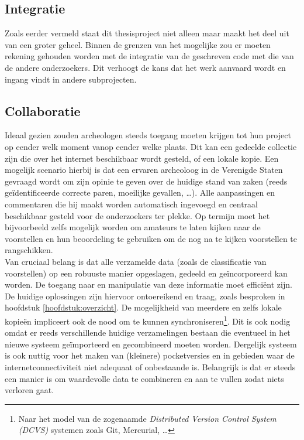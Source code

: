 \subsection{Integratie}
Zoals eerder vermeld staat dit thesisproject niet alleen maar maakt het deel uit van een groter geheel. Binnen de grenzen van het mogelijke zou er moeten rekening gehouden worden met de integratie van de geschreven code met die van de andere onderzoekers. Dit verhoogt de kans dat het werk aanvaard wordt en ingang vindt in andere subprojecten. 

\subsection{Collaboratie}
Ideaal gezien zouden archeologen steeds toegang moeten krijgen tot hun project op eender welk moment vanop eender welke plaats. Dit kan een gedeelde collectie zijn die over het internet beschikbaar wordt gesteld, of een lokale kopie. Een mogelijk scenario hierbij is dat een ervaren archeoloog in de Verenigde Staten gevraagd wordt om zijn opinie te geven over de huidige stand van zaken (reeds ge\"identificeerde correcte paren, moeilijke gevallen, \ldots). Alle aanpassingen en commentaren die hij maakt worden automatisch ingevoegd en centraal beschikbaar gesteld voor de onderzoekers ter plekke. Op termijn moet het bijvoorbeeld zelfs mogelijk worden om amateurs te laten kijken naar de voorstellen en hun beoordeling te gebruiken om de nog na te kijken voorstellen te rangschikken.\\

Van cruciaal belang is dat alle verzamelde data (zoals de classificatie van voorstellen) op een robuuste manier opgeslagen, gedeeld en ge\"incorporeerd kan worden. De toegang naar en manipulatie van deze informatie moet effici\"ent zijn. De huidige oplossingen zijn hiervoor ontoereikend en traag, zoals besproken in hoofdstuk \ref{hoofdstuk:overzicht}. De mogelijkheid van meerdere en zelfs lokale kopie\"en impliceert ook de nood om te kunnen synchroniseren\footnote{Naar het model van de zogenaamde \emph{Distributed Version Control System (DCVS)} systemen zoals Git, Mercurial, \ldots}. Dit is ook nodig omdat er reeds verschillende huidige verzamelingen bestaan die eventueel in het nieuwe systeem ge\"importeerd en gecombineerd moeten worden. Dergelijk systeem is ook nuttig voor het maken van (kleinere) pocketversies en in gebieden waar de internetconnectiviteit niet adequaat of onbestaande is. Belangrijk is dat er steeds een manier is om waardevolle data te combineren en aan te vullen zodat niets verloren gaat.

